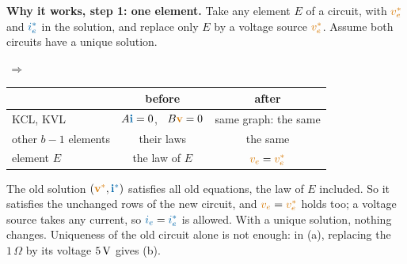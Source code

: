 \documentclass[11pt,a4paper]{article}
\newcommand{\Icol}[1]{\textcolor{ccur}{#1}}
\newcommand{\Vcol}[1]{\textcolor{cvolt}{#1}}
\newcommand{\ohm}{\,\Omega}
\newcommand{\oneE}[1]{%
  \draw[elem, rounded corners=4pt] (-0.9,0) rectangle (1.8,2.0);
  \node[font=\scriptsize, align=center] at (0.45,1.0) {rest of\\the circuit};
  \draw (1.8,1.7) -- (3.0,1.7); \draw (1.8,0.3) -- (3.0,0.3);
  \ifcase#1
    \draw[elem] (2.7,0.7) rectangle (3.3,1.3); \node[font=\small] at (3.0,1.0) {$E$};
    \draw (3.0,1.7) -- (3.0,1.3); \draw (3.0,0.7) -- (3.0,0.3);
    \draw[iar] (2.05,1.95) -- (2.65,1.95); \node[font=\small, text=ccur] at (2.35,2.28) {$i_e$};
    \node[pol] at (3.6,1.45) {$+$}; \node[pol] at (3.6,0.55) {$-$};
    \node[font=\small, text=cvolt] at (3.75,1.0) {$v_e$};
  \or
    \draw (3.0,0.3) to[american voltage source, invert] (3.0,1.7);
    \node[font=\small, text=cvolt, right] at (3.35,1.0) {$v_e^*$};
  \or
    \draw (3.0,1.7) to[american current source] (3.0,0.3);
    \node[font=\small, text=ccur, right] at (3.35,1.0) {$i_e^*$};
  \fi}
\begin{document}
\textbf{Why it works, step 1: one element.} Take any element $E$ of a circuit, with
$\Vcol{v_e^*}$ and $\Icol{i_e^*}$ in the solution, and replace only $E$ by a voltage source
$\Vcol{v_e^*}$. Assume both circuits have a unique solution.
\par\smallskip\noindent\begin{minipage}[c]{0.45\linewidth}
\centering
{}
\,$\Rightarrow$\,
\end{minipage}\hfill
\begin{minipage}[c]{0.54\linewidth}
\centering\scriptsize
\renewcommand{\arraystretch}{1.1}
\begin{tabular}{@{}l c c@{}}
\toprule
 & before & after\\
\midrule
KCL, KVL & $A\Icol{\mathbf{i}} = 0$, \ $B\Vcol{\mathbf{v}} = 0$ & same graph: the same\\
other $b - 1$ elements & their laws & the same\\
element $E$ & the law of $E$ & $\Vcol{v_e} = \Vcol{v_e^*}$\\
\bottomrule
\end{tabular}
\end{minipage}\par\smallskip
The old solution $(\Vcol{\mathbf{v}^*}, \Icol{\mathbf{i}^*})$ satisfies all old equations, the law of
$E$ included. So it satisfies the unchanged rows of the new circuit, and $\Vcol{v_e} =
\Vcol{v_e^*}$ holds too; a voltage source takes any current, so $\Icol{i_e} = \Icol{i_e^*}$ is
allowed. With a unique solution, nothing changes. Uniqueness of the old circuit alone is not
enough: in (a), replacing the $1\ohm$ by its voltage $5\,\mathrm{V}$ gives (b).
\end{document}
